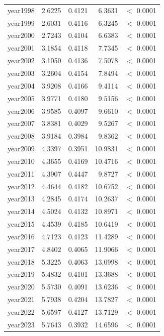 \begin{table}[H]
\begin{tabular}{lrrrr}
      year1998 & 2.6225 & 0.4121 & 6.3631 & $<$ 0.0001 \\ 
      year1999 & 2.6031 & 0.4116 & 6.3245 & $<$ 0.0001 \\ 
      year2000 & 2.7243 & 0.4104 & 6.6383 & $<$ 0.0001 \\ 
      year2001 & 3.1854 & 0.4118 & 7.7345 & $<$ 0.0001 \\ 
      year2002 & 3.1050 & 0.4136 & 7.5078 & $<$ 0.0001 \\ 
      year2003 & 3.2604 & 0.4154 & 7.8494 & $<$ 0.0001 \\ 
      year2004 & 3.9208 & 0.4166 & 9.4114 & $<$ 0.0001 \\ 
      year2005 & 3.9771 & 0.4180 & 9.5156 & $<$ 0.0001 \\ 
      year2006 & 3.9585 & 0.4097 & 9.6610 & $<$ 0.0001 \\ 
      year2007 & 3.8381 & 0.4029 & 9.5267 & $<$ 0.0001 \\ 
      year2008 & 3.9184 & 0.3984 & 9.8362 & $<$ 0.0001 \\ 
      year2009 & 4.3397 & 0.3951 & 10.9831 & $<$ 0.0001 \\ 
      year2010 & 4.3655 & 0.4169 & 10.4716 & $<$ 0.0001 \\ 
      year2011 & 4.3907 & 0.4447 & 9.8727 & $<$ 0.0001 \\ 
      year2012 & 4.4644 & 0.4182 & 10.6752 & $<$ 0.0001 \\ 
      year2013 & 4.2845 & 0.4174 & 10.2637 & $<$ 0.0001 \\ 
      year2014 & 4.5024 & 0.4132 & 10.8971 & $<$ 0.0001 \\ 
      year2015 & 4.4539 & 0.4185 & 10.6419 & $<$ 0.0001 \\ 
      year2016 & 4.7123 & 0.4123 & 11.4289 & $<$ 0.0001 \\ 
      year2017 & 4.8402 & 0.4065 & 11.9066 & $<$ 0.0001 \\ 
      year2018 & 5.3225 & 0.4063 & 13.0998 & $<$ 0.0001 \\ 
      year2019 & 5.4832 & 0.4101 & 13.3688 & $<$ 0.0001 \\ 
      year2020 & 5.5730 & 0.4091 & 13.6236 & $<$ 0.0001 \\ 
      year2021 & 5.7938 & 0.4204 & 13.7827 & $<$ 0.0001 \\ 
      year2022 & 5.6597 & 0.4127 & 13.7129 & $<$ 0.0001 \\ 
      year2023 & 5.7643 & 0.3932 & 14.6596 & $<$ 0.0001 \\  
       \hline

\end{tabular}
\end{table}

